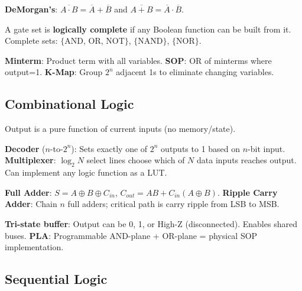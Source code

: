 \begin{theorem}
	\textbf{DeMorgan's}: $\overline{A \cdot B} = \overline{A} + \overline{B}$ and $\overline{A + B} = \overline{A} \cdot \overline{B}$.
\end{theorem}

\begin{important}
	A gate set is \textbf{logically complete} if any Boolean function can be built from it. Complete sets: $\{$AND, OR, NOT$\}$, $\{$NAND$\}$, $\{$NOR$\}$.
\end{important}

\begin{definition}
	\textbf{Minterm}: Product term with all variables. \textbf{SOP}: OR of minterms where output=1. \textbf{K-Map}: Group $2^n$ adjacent 1s to eliminate changing variables.
\end{definition}

\subsection{Combinational Logic}

\begin{definition}
	Output is a pure function of current inputs (no memory/state).
\end{definition}

\begin{definition}
	\textbf{Decoder} ($n$-to-$2^n$): Sets exactly one of $2^n$ outputs to 1 based on $n$-bit input.
	\textbf{Multiplexer}: $\log_2 N$ select lines choose which of $N$ data inputs reaches output. Can implement any logic function as a LUT.
\end{definition}

\begin{definition}
	\textbf{Full Adder}: $S = A \oplus B \oplus C_{in}$, $C_{out} = AB + C_{in}(A \oplus B)$.
	\textbf{Ripple Carry Adder}: Chain $n$ full adders; critical path is carry ripple from LSB to MSB.
\end{definition}

\begin{lemma}
	\textbf{Tri-state buffer}: Output can be 0, 1, or High-Z (disconnected). Enables shared buses.
	\textbf{PLA}: Programmable AND-plane + OR-plane = physical SOP implementation.
\end{lemma}

\subsection{Sequential Logic}

